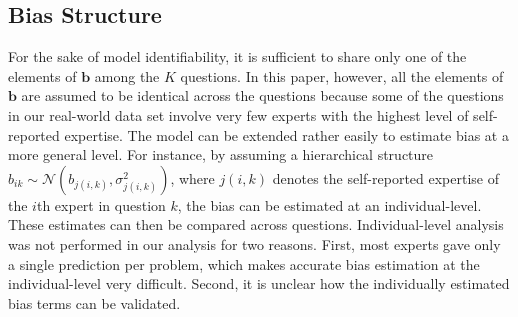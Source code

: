 \documentclass[aoas, preprint]{imsart}
\numberwithin{equation}{section}
\theoremstyle{plain}
\begin{document}
\subsection{Bias Structure}
\label{BiasStr}
For the sake of model identifiability, it is sufficient to share only one of the elements of $\boldsymbol{b}$ among the $K$ questions. In this paper, however, all the elements of $\boldsymbol{b}$ are assumed to be identical across the questions because some of the questions in our real-world data set involve very few experts with the highest level of self-reported expertise. The model can be extended rather easily to estimate bias at a more general level. For instance, by assuming a hierarchical structure $b_{ik} \sim \mathcal{N}\left(b_{j(i,k)}, \sigma^2_{j(i,k)}\right)$, where $j(i,k)$ denotes the  self-reported expertise of the $i$th expert in question $k$, the bias can be estimated at an individual-level. These estimates can then be compared across questions. Individual-level analysis was not performed in our analysis for two reasons. First, most experts gave only a single prediction per problem, which makes accurate bias estimation at the individual-level very difficult. Second, it is unclear how the individually estimated bias terms can be validated. 

\end{document}
